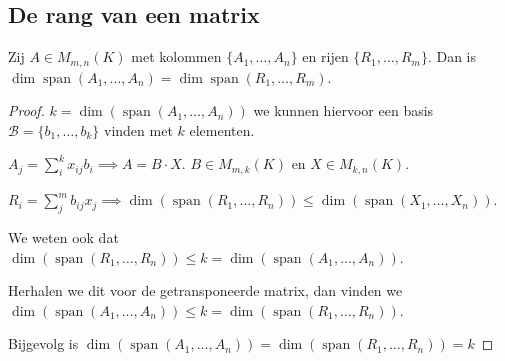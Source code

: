 \subsection{De rang van een matrix}

\begin{stelling}[5.1.2]
    Zij $A \in M_{m,n}(K)$ met kolommen $\{A_1, \dots, A_n\}$ en rijen $\{R_1, \dots, R_m\}$. Dan is $\dim \operatorname{span}(A_1, \dots, A_n) = \dim \operatorname{span}(R_1, \dots, R_m)$.
\end{stelling}
\begin{proof}
    \(k = \dim(\operatorname{span}(A_1,\dots,A_n))\) we kunnen hiervoor een basis \(\mathcal{B} = \{b_1,\dots,b_k\}\) vinden met \(k\) elementen.

    \(A_j = \sum_i^k x_{ij} b_i \implies A = B \cdot X\). \(B \in M_{m,k}(K)\) en \(X \in M_{k,n}(K)\).

    \(R_i = \sum_j^m b_{ij} x_j \implies \dim(\operatorname{span}(R_1,\dots,R_n)) \leq \dim(\operatorname{span}(X_1,\dots,X_n))\).

    We weten ook dat \(\dim(\operatorname{span}(R_1,\dots,R_n)) \leq k = \dim(\operatorname{span}(A_1,\dots,A_n))\).

    Herhalen we dit voor de getransponeerde matrix,
    dan vinden we  \(\dim(\operatorname{span}(A_1,\dots,A_n)) \leq k = \dim(\operatorname{span}(R_1,\dots,R_n))\).

    Bijgevolg is \(\dim(\operatorname{span}(A_1,\dots,A_n)) = \dim(\operatorname{span}(R_1,\dots,R_n)) = k\)
\end{proof}

